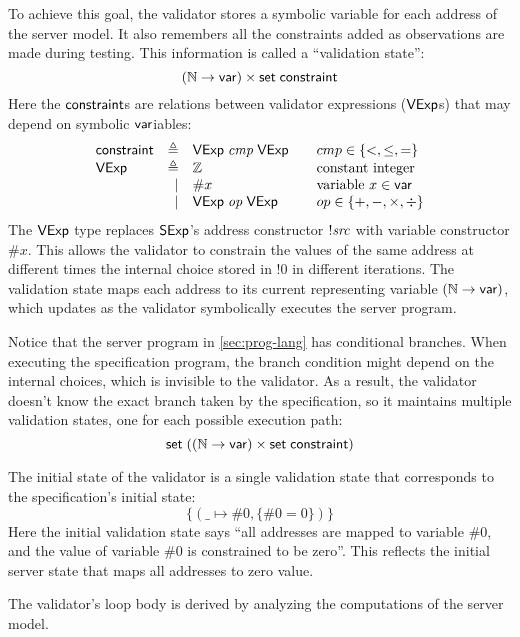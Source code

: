 To achieve this goal, the validator stores a symbolic variable for each address
of the server model.  It also remembers all the constraints added as
observations are made during testing.  This information is called a ``validation
state'':
\[(\mathbb N\to\mathsf{var})\times\mathsf{set}\;\mathsf{constraint}\]
Here the $\mathsf{constraint}$s are relations between validator expressions ($\mathsf{VExp}$s)
that may depend on symbolic $\mathsf{var}$iables:
\[\begin{array}{lrl@{\qquad}l}
\constraint&\triangleq&\Vexp\ccmp\Vexp&cmp\in\{<,\le,=\}\\
\Vexp&\triangleq&\Int&\text{constant integer}\\
&\mid&\#x&\text{variable }x\in\Var\\
&\mid&\Vexp\oop\Vexp&op\in\{+,-,\times,\div\}\\
\end{array}\]
The $\mathsf{VExp}$ type replaces $\mathsf{SExp}$'s address constructor $!\mathit{src}$ with variable
constructor $\#x$.  This allows the validator to constrain the values of the
same address at different times \eg the internal choice stored in $!0$ in
different iterations.  The validation state maps each address to its current
representing variable $(\mathbb N\to\mathsf{var})$, which updates as the validator
symbolically executes the server program.

Notice that the server program in \autoref{sec:prog-lang} has conditional
branches.  When executing the specification program, the branch condition might
depend on the internal choices, which is invisible to the validator.  As a
result, the validator doesn't know the exact branch taken by the specification,
so it maintains multiple validation states, one for each possible execution
path:
\[\mathsf{set}\;((\mathbb N\to\mathsf{var})\times\mathsf{set}\;\mathsf{constraint})\]

The initial state of the validator is a single validation state that corresponds
to the specification's initial state:
\[\{(\_\mapsto\#0,\{\#0=0\})\}\]
Here the initial validation state says ``all addresses are mapped to variable
$\#0$, and the value of variable $\#0$ is constrained to be zero''.  This
reflects the initial server state that maps all addresses to zero value.

The validator's loop body is derived by analyzing the computations of the server
model.

